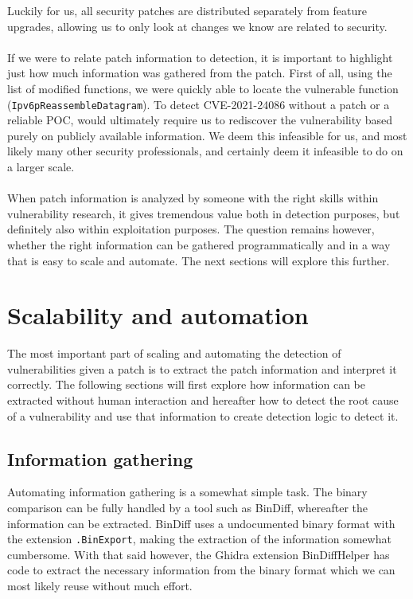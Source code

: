 \documentclass{report}
\begin{document}
Luckily for us, all security patches are distributed separately from feature upgrades, allowing us to only look at changes we know are related to security.
\\
\\
If we were to relate patch information to detection, it is important to highlight just how much information was gathered from the patch. First of all, using the list of modified functions, we were quickly able to locate the vulnerable function (\texttt{Ipv6pReassembleDatagram}). To detect CVE-2021-24086 without a patch or a reliable \gls{POC}, would ultimately require us to rediscover the vulnerability based purely on publicly available information. We deem this infeasible for us, and most likely many other security professionals, and certainly deem it infeasible to do on a larger scale.
\\
\\
When patch information is analyzed by someone with the right skills within vulnerability research, it gives tremendous value both in detection purposes, but definitely also within exploitation purposes. The question remains however, whether the right information can be gathered programmatically and in a way that is easy to scale and automate. The next sections will explore this further.

\section{Scalability and automation}
The most important part of scaling and automating the detection of vulnerabilities given a patch is to extract the patch information and interpret it correctly. The following sections will first explore how information can be extracted without human interaction and hereafter how to detect the root cause of a vulnerability and use that information to create detection logic to detect it.

\subsection{Information gathering}
Automating information gathering is a somewhat simple task. The binary comparison can be fully handled by a tool such as BinDiff\cite{url:bindiff:homepage}, whereafter the information can be extracted. BinDiff uses a undocumented binary format with the extension \texttt{.BinExport}, making the extraction of the information somewhat cumbersome. With that said however, the Ghidra\cite{url:ghidra:homepage} extension BinDiffHelper\cite{url:BinDiffHelper:homepage} has code to extract the necessary information from the binary format which we can most likely reuse without much effort.
\end{document}
